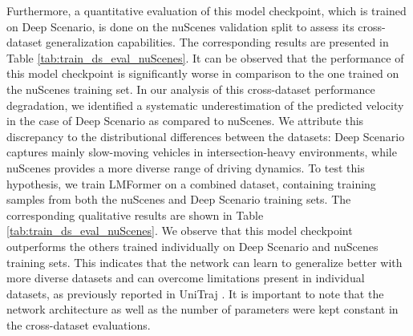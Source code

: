 \begin{table}[b]
    \centering
    \caption{LMFormer Cross Datataset performance validated on nuScenes validation split}
    \label{tab:train_ds_eval_nuScenes}
\end{table}

Furthermore, a quantitative evaluation of this model checkpoint, which is trained on Deep Scenario, is done on the nuScenes validation split to assess its cross-dataset generalization capabilities. The corresponding results are presented in Table \ref{tab:train_ds_eval_nuScenes}. It can be observed that the performance of this model checkpoint is significantly worse in comparison to the one trained on the nuScenes training set. In our analysis of this cross-dataset performance degradation, we identified a systematic underestimation of the predicted velocity in the case of Deep Scenario as compared to nuScenes. We attribute this discrepancy to the distributional differences between the datasets: Deep Scenario captures mainly slow-moving vehicles in intersection-heavy environments, while nuScenes provides a more diverse range of driving dynamics. To test this hypothesis, we train LMFormer on a combined dataset, containing training samples from both the nuScenes and Deep Scenario training sets. The corresponding qualitative results are shown in Table \ref{tab:train_ds_eval_nuScenes}. We observe that this model checkpoint outperforms the others trained individually on Deep Scenario and nuScenes training sets. This indicates that the network can learn to generalize better with more diverse datasets and can overcome limitations present in individual datasets, as previously reported in UniTraj \cite{feng2024unitraj}. It is important to note that the network architecture as well as the number of parameters were kept constant in the cross-dataset evaluations. 


